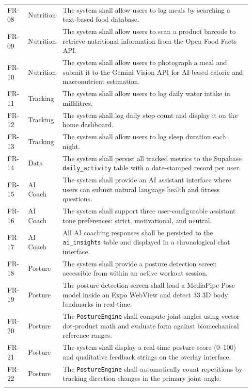 \begin{xltabular}{\textwidth}{llX}
	FR-08 & Nutrition & The system shall allow users to log meals by searching a text-based food database. \\ \addlinespace[3pt]
	FR-09 & Nutrition & The system shall allow users to scan a product barcode to retrieve nutritional information from the Open Food Facts API. \\ \addlinespace[3pt]
	FR-10 & Nutrition & The system shall allow users to photograph a meal and submit it to the Gemini Vision API for AI-based calorie and macronutrient estimation. \\ \addlinespace[3pt]
	FR-11 & Tracking & The system shall allow users to log daily water intake in millilitres. \\ \addlinespace[3pt]
	FR-12 & Tracking & The system shall log daily step count and display it on the home dashboard. \\ \addlinespace[3pt]
	FR-13 & Tracking & The system shall allow users to log sleep duration each night. \\ \addlinespace[3pt]
	FR-14 & Data & The system shall persist all tracked metrics to the Supabase \texttt{daily\_activity} table with a date-stamped record per user. \\ \addlinespace[6pt]
	
	FR-15 & AI Coach & The system shall provide an AI assistant interface where users can submit natural language health and fitness questions. \\ \addlinespace[3pt]
	FR-16 & AI Coach & The system shall support three user-configurable assistant tone preferences: strict, motivational, and neutral. \\ \addlinespace[3pt]
	FR-17 & AI Coach & All AI coaching responses shall be persisted to the \texttt{ai\_insights} table and displayed in a chronological chat interface. \\ \addlinespace[6pt]
	
	FR-18 & Posture & The system shall provide a posture detection screen accessible from within an active workout session. \\ \addlinespace[3pt]
	FR-19 & Posture & The posture detection screen shall load a MediaPipe Pose model inside an Expo WebView and detect 33 3D body landmarks in real-time. \\ \addlinespace[3pt]
	FR-20 & Posture & The \texttt{PostureEngine} shall compute joint angles using vector dot-product math and evaluate form against biomechanical reference ranges. \\ \addlinespace[3pt]
	FR-21 & Posture & The system shall display a real-time posture score (0--100) and qualitative feedback strings on the overlay interface. \\ \addlinespace[3pt]
	FR-22 & Posture & The \texttt{PostureEngine} shall automatically count repetitions by tracking direction changes in the primary joint angle. \\ \addlinespace[6pt]
	

\end{xltabular}
